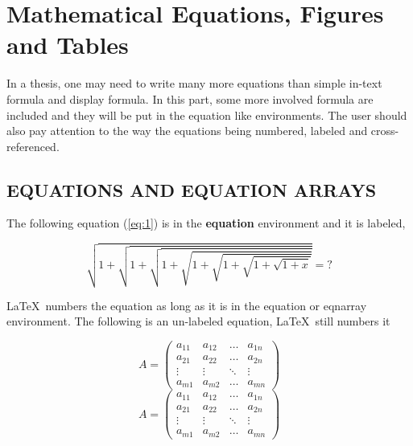 
\part{Mathematical Equations, Figures and Tables}

In a thesis, one may need to write many more equations than simple in-text
formula and display formula. In this part, some more involved
formula are included and they will be put in the equation like environments.
The user should also pay attention to the way the equations being numbered,
labeled and cross-referenced.


\chapter{EQUATIONS AND EQUATION ARRAYS}

The following equation (\ref{eq:1}) is in the \textbf{equation}
environment and it is labeled,

\begin{equation}
\sqrt{1+\sqrt{1+\sqrt{1+\sqrt{1+\sqrt{1+\sqrt{1+\sqrt{1+x}}}}}}}
 = ? \label{eq:1}
\end{equation}

\LaTeX\ numbers the equation  as long as it is in the equation
or eqnarray environment. The following is an un-labeled equation,
\LaTeX\ still numbers it

\ifAMS
\begin{equation}
    A=
    \begin{pmatrix}
	    a_{11}&a_{12}&\ldots&a_{1n}\\
	     a_{21}&a_{22}&\ldots&a_{2n}\\
	     \vdots&\vdots&\ddots&\vdots\\
	     a_{m1}&a_{m2}&\ldots&a_{mn}
    \end{pmatrix}
\end{equation}
\else
\begin{equation}
    A=
    \left(
    \begin{array}{cccc}
	    a_{11}&a_{12}&\ldots&a_{1n}\\
	     a_{21}&a_{22}&\ldots&a_{2n}\\
	     \vdots&\vdots&\ddots&\vdots\\
	     a_{m1}&a_{m2}&\ldots&a_{mn}
    \end{array}
    \right)
\end{equation}
\fi

